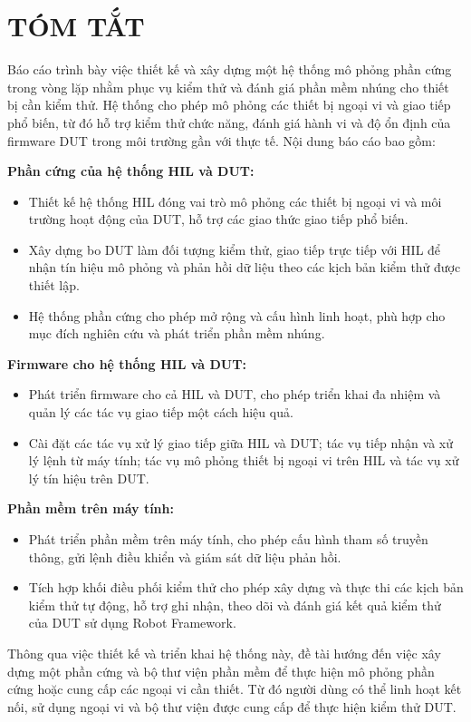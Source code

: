 \chapter*{TÓM TẮT}

Báo cáo trình bày việc thiết kế và xây dựng một hệ thống mô phỏng phần cứng trong vòng lặp nhằm phục vụ kiểm thử và đánh giá phần mềm nhúng cho thiết bị cần kiểm thử. Hệ thống cho phép mô phỏng các thiết bị ngoại vi và giao tiếp phổ biến, từ đó hỗ trợ kiểm thử chức năng, đánh giá hành vi và độ ổn định của firmware DUT trong môi trường gần với thực tế. Nội dung báo cáo bao gồm:

\textbf{Phần cứng của hệ thống HIL và DUT:}
\begin{itemize}
    \item Thiết kế hệ thống HIL đóng vai trò mô phỏng các thiết bị ngoại vi và môi trường hoạt động của DUT, hỗ trợ các giao thức giao tiếp phổ biến.
    \item Xây dựng bo DUT làm đối tượng kiểm thử, giao tiếp trực tiếp với HIL để nhận tín hiệu mô phỏng và phản hồi dữ liệu theo các kịch bản kiểm thử được thiết lập.
    \item Hệ thống phần cứng cho phép mở rộng và cấu hình linh hoạt, phù hợp cho mục đích nghiên cứu và phát triển phần mềm nhúng.
\end{itemize}

\textbf{Firmware cho hệ thống HIL và DUT:}
\begin{itemize}
    \item Phát triển firmware cho cả HIL và DUT, cho phép triển khai đa nhiệm và quản lý các tác vụ giao tiếp một cách hiệu quả.
    \item Cài đặt các tác vụ xử lý giao tiếp giữa HIL và DUT; tác vụ tiếp nhận và xử lý lệnh từ máy tính; tác vụ mô phỏng thiết bị ngoại vi trên HIL và tác vụ xử lý tín hiệu trên DUT.
\end{itemize}

\textbf{Phần mềm trên máy tính:}
\begin{itemize}
    \item Phát triển phần mềm trên máy tính, cho phép cấu hình tham số truyền thông, gửi lệnh điều khiển và giám sát dữ liệu phản hồi.
    \item Tích hợp khối điều phối kiểm thử cho phép xây dựng và thực thi các kịch bản kiểm thử tự động, hỗ trợ ghi nhận, theo dõi và đánh giá kết quả kiểm thử của DUT sử dụng Robot Framework.
\end{itemize}

Thông qua việc thiết kế và triển khai hệ thống này, đề tài hướng đến việc xây dựng một phần cứng và bộ thư viện phần mềm để thực hiện mô phỏng phần cứng hoặc cung cấp các ngoại vi cần thiết.
Từ đó người dùng có thể linh hoạt kết nối, sử dụng ngoại vi và bộ thư viện được cung cấp để thực hiện kiểm thử DUT.
